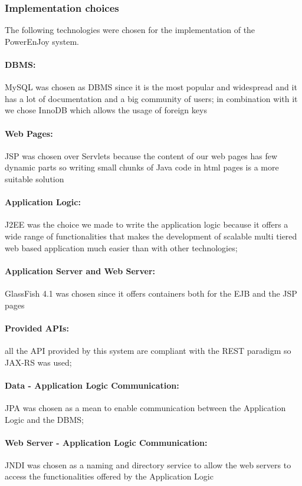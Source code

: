 \subsubsection{Implementation choices}
The following technologies were chosen for the implementation of the PowerEnJoy system.
\paragraph{DBMS:} MySQL was chosen as DBMS since it is the most popular and widespread and it has a lot of documentation and a big community of users; in combination with it we chose InnoDB which allows the usage of foreign keys
\paragraph{Web Pages:} JSP was chosen over Servlets because the content of our web pages has few dynamic parts so writing small chunks of Java code in html pages is a more suitable solution
\paragraph{Application Logic:} J2EE was the choice we made to write the application logic because it offers a wide range of functionalities that makes the development of scalable multi tiered web based application much easier than with other technologies;
\paragraph{Application Server and Web Server:} GlassFish 4.1 was chosen since it offers containers both for the EJB and the JSP pages 
\paragraph{Provided APIs:} all the API provided by this system are compliant with the REST paradigm so JAX-RS was used;
\paragraph{Data - Application Logic Communication:} JPA was chosen as a mean to enable communication between the Application Logic and the DBMS;
\paragraph{Web Server - Application Logic Communication:} JNDI was chosen as a naming and directory service to allow the web servers to access the functionalities offered by the Application Logic


